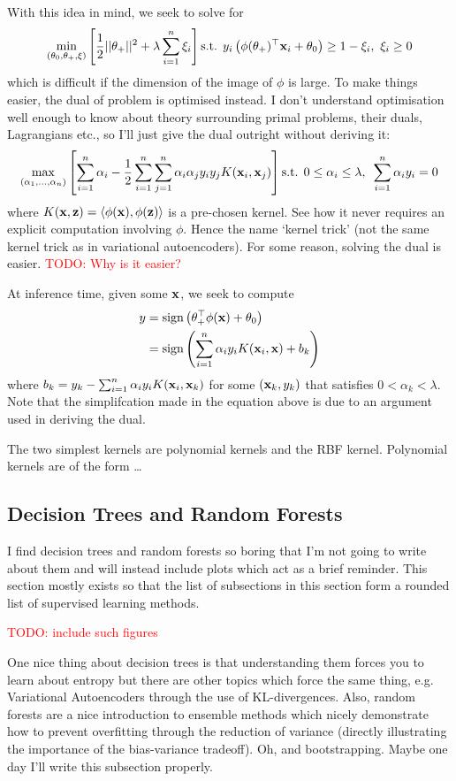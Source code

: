 \documentclass[11pt]{article}
\begin{document}
With this idea in mind, we seek to solve for
$$
\min_{(\theta_0,\theta_+,\xi)}\left[\frac{1}{2}||\theta_+||^2+\lambda\sum_{i=1}^n\xi_i\right]\text{s.t. } y_i\left(\phi(\theta_+)^\top\mathbf{x}_i+\theta_0\right)\geq 1-\xi_i,\text{ }\xi_i\geq0
$$
which is difficult if the dimension of the image of $\phi$ is large. To make things easier, the dual of problem is optimised instead. I don't understand optimisation well enough to know about theory surrounding primal problems, their duals, Lagrangians etc., so I'll just give the dual outright without deriving it:
$$
\max_{(\alpha_1,\dots,\alpha_n)}\left[\sum_{i=1}^n\alpha_i-\frac{1}{2}\sum_{i=1}^n\sum_{j=1}^n\alpha_i\alpha_jy_iy_jK(\mathbf{x}_i,\mathbf{x}_j)\right]\text{s.t. } 0\leq\alpha_i\leq\lambda,\text{ }\sum_{i=1}^n\alpha_iy_i=0
$$
where $K(\mathbf{x},\mathbf{z})=\langle\phi(\mathbf{x}),\phi(\mathbf{z})\rangle$ is a pre-chosen kernel. See how it never requires an explicit computation involving $\phi$. Hence the name `kernel trick' (not the same kernel trick as in variational autoencoders). For some reason, solving the dual is easier. \textcolor{red}{TODO: Why is it easier?}

At inference time, given some $\mathbf{x}$, we seek to compute
\begin{align*}
    y
    &=
    \text{sign}\left(\theta_+^\top\phi(\mathbf{x})+\theta_0\right)\\
    &=
    \text{sign}\left(\sum_{i=1}^n\alpha_iy_iK(\mathbf{x}_i,\mathbf{x})+b_k\right)
\end{align*}
where $b_k=y_k-\sum_{i=1}^n\alpha_iy_iK(\mathbf{x}_i,\mathbf{x}_k)$ for some $(\mathbf{x}_k,y_k)$ that satisfies $0<\alpha_k<\lambda$. Note that the simplifcation made in the equation above is due to an argument used in deriving the dual.

The two simplest kernels are polynomial kernels and the RBF kernel. Polynomial kernels are of the form \dots

\subsection{Decision Trees and Random Forests}
I find decision trees and random forests so boring that I'm not going to write about them and will instead include plots which act as a brief reminder. This section mostly exists so that the list of subsections in this section form a rounded list of supervised learning methods. 

\textcolor{red}{TODO: include such figures}

One nice thing about decision trees is that understanding them forces you to learn about entropy but there are other topics which force the same thing, e.g. Variational Autoencoders through the use of KL-divergences. Also, random forests are a nice introduction to ensemble methods which nicely demonstrate how to prevent overfitting through the reduction of variance (directly illustrating the importance of the bias-variance tradeoff). Oh, and bootstrapping. Maybe one day I'll write this subsection properly.
\end{document}
